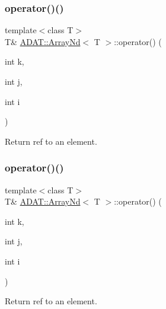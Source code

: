 \subsubsection{\texorpdfstring{operator()()}{operator()()}\hspace{0.1cm}{\footnotesize\ttfamily [13/24]}}
{\footnotesize\ttfamily template$<$class T$>$ \\
T\& \mbox{\hyperlink{classADAT_1_1ArrayNd}{A\+D\+A\+T\+::\+Array\+Nd}}$<$ T $>$\+::operator() (\begin{DoxyParamCaption}\item[{int}]{k,  }\item[{int}]{j,  }\item[{int}]{i }\end{DoxyParamCaption})\hspace{0.3cm}{\ttfamily [inline]}}



Return ref to an element. 

\mbox{\label{classADAT_1_1ArrayNd_a8c15c0d70203e59f5f746350eb6262a9}} 
\subsubsection{\texorpdfstring{operator()()}{operator()()}\hspace{0.1cm}{\footnotesize\ttfamily [14/24]}}
{\footnotesize\ttfamily template$<$class T$>$ \\
T\& \mbox{\hyperlink{classADAT_1_1ArrayNd}{A\+D\+A\+T\+::\+Array\+Nd}}$<$ T $>$\+::operator() (\begin{DoxyParamCaption}\item[{int}]{k,  }\item[{int}]{j,  }\item[{int}]{i }\end{DoxyParamCaption})\hspace{0.3cm}{\ttfamily [inline]}}



Return ref to an element. 

\mbox{\label{classADAT_1_1ArrayNd_a8c15c0d70203e59f5f746350eb6262a9}} 
